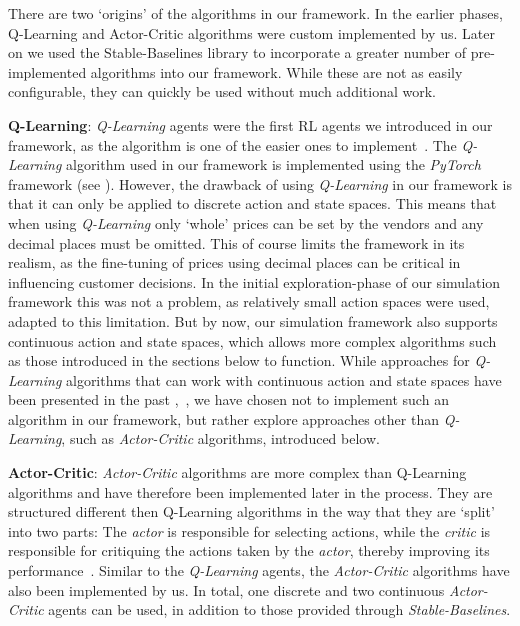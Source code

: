 There are two `origins' of the algorithms in our framework. In the earlier phases, Q-Learning and Actor-Critic algorithms were custom implemented by us. Later on we used the Stable-Baselines library to incorporate a greater number of pre-implemented algorithms into our framework. While these are not as easily configurable, they can quickly be used without much additional work.

\medskip
\noindent\textbf{Q-Learning}: \emph{Q-Learning} agents were the first RL agents we introduced in our framework, as the algorithm is one of the easier ones to implement~\cite{reinforcementLearningOverview}. The \emph{Q-Learning} algorithm used in our framework is implemented using the \emph{PyTorch} framework (see \cite{Pytorch}). However, the drawback of using \emph{Q-Learning} in our framework is that it can only be applied to discrete action and state spaces. This means that when using \emph{Q-Learning} only `whole' prices can be set by the vendors and any decimal places must be omitted. This of course limits the framework in its realism, as the fine-tuning of prices using decimal places can be critical in influencing customer decisions. In the initial exploration-phase of our simulation framework this was not a problem, as relatively small action spaces were used, adapted to this limitation. But by now, our simulation framework also supports continuous action and state spaces, which allows more complex algorithms such as those introduced in the sections below to function. While approaches for \emph{Q-Learning} algorithms that can work with continuous action and state spaces have been presented in the past \cite{QLearningContinuous},~\cite{QLearningContinuous2}, we have chosen not to implement such an algorithm in our framework, but rather explore approaches other than \emph{Q-Learning}, such as \emph{Actor-Critic} algorithms, introduced below.

\clearpage
\noindent\textbf{Actor-Critic}: \emph{Actor-Critic} algorithms are more complex than Q-Learning algorithms and have therefore been implemented later in the process. They are structured different then Q-Learning algorithms in the way that they are `split' into two parts: The \emph{actor} is responsible for selecting actions, while the \emph{critic} is responsible for critiquing  the actions taken by the \emph{actor}, thereby improving its performance~\cite{ActorCritic}. Similar to the \emph{Q-Learning} agents, the \emph{Actor-Critic} algorithms have also been implemented by us. In total, one discrete and two continuous \emph{Actor-Critic} agents can be used, in addition to those provided through \emph{Stable-Baselines}.

